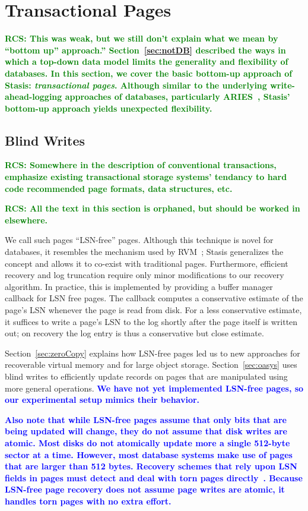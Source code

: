 \documentclass[letterpaper,twocolumn,10pt]{article}
\newcommand{\yad}{Stasis\xspace}
\newcommand{\yads}{Stasis'\xspace}
\newcommand{\diff}[1]{\textcolor{blue}{\bf #1}}
\newcommand{\rcs}[1]{\textcolor{green}{\bf RCS: #1}}
\begin{document}
\section{Transactional Pages}

\rcs{This was weak, but we still don't explain what we mean by ``bottom up'' approach.'' Section~\ref{sec:notDB} described the ways in which a top-down data model
limits the generality and flexibility of databases.  In this section,
we cover the basic bottom-up approach of \yad: {\em transactional
pages}. Although similar to the underlying write-ahead-logging
approaches of databases, particularly ARIES~\cite{aries}, \yads
bottom-up approach yields unexpected flexibility.}

\subsection{Blind Writes}
\label{sec:blindWrites}
\rcs{Somewhere in the description of conventional transactions, emphasize existing transactional storage systems' tendancy to hard code recommended page formats, data structures, etc.}

\rcs{All the text in this section is orphaned, but should be worked in elsewhere.}

We call such pages ``LSN-free'' pages.  Although this technique is
novel for databases, it resembles the mechanism used by
RVM~\cite{lrvm}; \yad generalizes the concept and allows it to
co-exist with traditional pages.  Furthermore, efficient recovery and
log truncation require only minor modifications to our recovery
algorithm.  In practice, this is implemented by providing a buffer manager callback
for LSN free pages.  The callback computes a
conservative estimate of the page's LSN whenever the page is read from disk.
For a less conservative estimate, it suffices to write a page's LSN to
the log shortly after the page itself is written out; on recovery the
log entry is thus a conservative but close estimate.

Section~\ref{sec:zeroCopy} explains how LSN-free pages led us to new 
approaches for recoverable virtual memory and for large object storage.  
Section~\ref{sec:oasys} uses blind writes to efficiently update records 
on pages that are manipulated using more general operations.  \diff{We 
have not yet implemented LSN-free pages, so our experimental setup mimics
their behavior.}

\diff{Also note that while LSN-free pages assume that only bits that
are being updated will change, they do not assume that disk writes are
atomic.  Most disks do not atomically update more a single 512-byte
sector at a time.  However, most database systems make use of pages
that are larger than 512 bytes.  Recovery schemes that rely upon LSN
fields in pages must detect and deal with torn pages
directly~\cite{tornPageStuffMohan}.  Because LSN-free page recovery
does not assume page writes are atomic, it handles torn pages with no
extra effort.}
\end{document}
